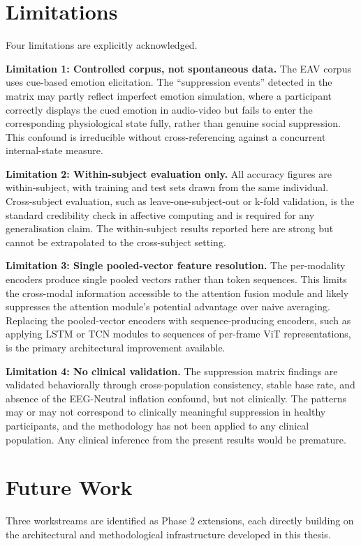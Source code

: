 \section{Limitations}
Four limitations are explicitly acknowledged.

\textbf{Limitation 1: Controlled corpus, not spontaneous data.} The EAV corpus uses cue-based emotion elicitation. The ``suppression events'' detected in the matrix may partly reflect imperfect emotion simulation, where a participant correctly displays the cued emotion in audio-video but fails to enter the corresponding physiological state fully, rather than genuine social suppression. This confound is irreducible without cross-referencing against a concurrent internal-state measure.

\textbf{Limitation 2: Within-subject evaluation only.} All accuracy figures are within-subject, with training and test sets drawn from the same individual. Cross-subject evaluation, such as leave-one-subject-out or k-fold validation, is the standard credibility check in affective computing and is required for any generalisation claim. The within-subject results reported here are strong but cannot be extrapolated to the cross-subject setting.

\textbf{Limitation 3: Single pooled-vector feature resolution.} The per-modality encoders produce single pooled vectors rather than token sequences. This limits the cross-modal information accessible to the attention fusion module and likely suppresses the attention module's potential advantage over naive averaging. Replacing the pooled-vector encoders with sequence-producing encoders, such as applying LSTM or TCN modules to sequences of per-frame ViT representations, is the primary architectural improvement available.

\textbf{Limitation 4: No clinical validation.} The suppression matrix findings are validated behaviorally through cross-population consistency, stable base rate, and absence of the EEG-Neutral inflation confound, but not clinically. The patterns may or may not correspond to clinically meaningful suppression in healthy participants, and the methodology has not been applied to any clinical population. Any clinical inference from the present results would be premature.

\section{Future Work}
Three workstreams are identified as Phase 2 extensions, each directly building on the architectural and methodological infrastructure developed in this thesis.


